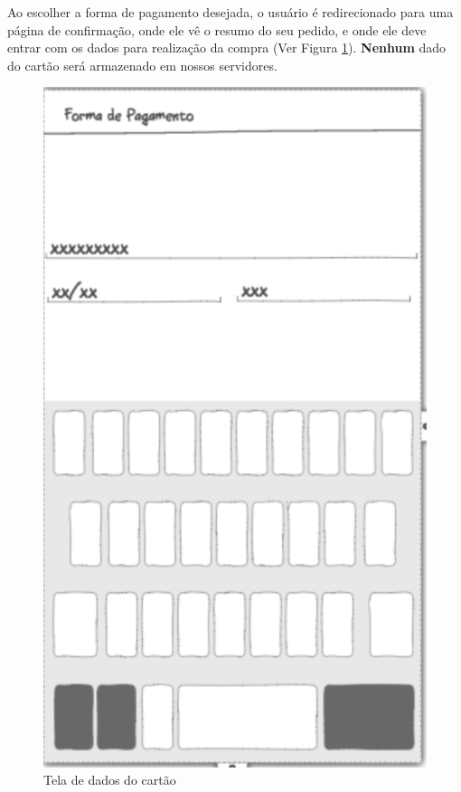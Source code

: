 \newpage

Ao escolher a forma de pagamento desejada, o usuário é redirecionado para uma página de confirmação, onde ele vê o resumo do seu pedido, e onde ele deve entrar com os dados para realização da compra (Ver Figura \ref{fig:pagamento}). \textbf{Nenhum} dado do cartão será armazenado em nossos servidores.

\begin{figure}[h]
	\centering
    \includegraphics[scale=0.7]{figuras/pagamento}
	\caption{Tela de dados do cartão}
    \label{fig:pagamento}
\end{figure}

